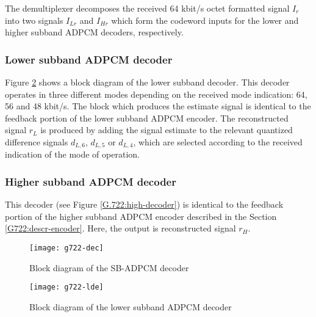 The demultiplexer decomposes the received 64 kbit/s octet formatted
signal $I_r$ into two signals $I_{Lr}$ and $I_{Hr}$ which form the
codeword inputs for the lower and higher subband ADPCM decoders,
respectively.


\subsubsection{Lower subband ADPCM decoder}

Figure \ref{G.722:low-decoder} shows a block diagram of the lower
subband decoder. This decoder operates in three different modes
depending on the received mode indication: 64, 56 and 48 kbit/s. The
block which produces the estimate signal is identical to the feedback
portion of the lower subband ADPCM encoder.  The reconstructed signal
$r_L$ is produced by adding the signal estimate to the relevant
quantized difference signals $d_{L,6}$, $d_{L,5}$ or $d_{L,4}$, which
are selected according to the received indication of the mode of
operation.


\subsubsection{Higher subband ADPCM decoder}

This decoder (see Figure \ref{G.722:high-decoder}) is identical to the
feedback portion of the higher subband ADPCM encoder described in the
Section \ref{G722:descr-encoder}. Here, the output is reconstructed
signal $r_H$.

\begin{figure}
    \begin{center}
        \texttt{[image: g722-dec]}
  \end{center}
  \caption{Block diagram of the SB-ADPCM decoder
           \label{G.722:decoder}}
\end{figure}

\begin{figure}
    \begin{center}
        \texttt{[image: g722-lde]}
  \end{center}
  \caption{Block diagram of the lower subband ADPCM decoder
           \label{G.722:low-decoder}}
\end{figure}

